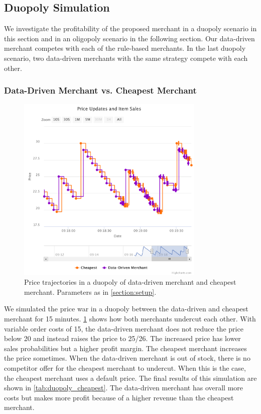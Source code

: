 \subsection{Duopoly Simulation}
\label{section:duopoly}
We investigate the profitability of the proposed merchant in a duopoly scenario in this section and in an oligopoly scenario in the following section.
Our data-driven merchant competes with each of the rule-based merchants.
In the last duopoly scenario, two data-driven merchants with the same strategy compete with each other.

\subsubsection{Data-Driven Merchant vs. Cheapest Merchant}

\begin{figure}[t]
	\centering
	\includegraphics[width=0.8\textwidth]{figures/duopoly_cheapest_prices}
	\caption[Price Trajectories: Data-Driven Merchant versus Cheapest Merchant]{Price trajectories in a duopoly of data-driven merchant and cheapest merchant. Parameters as in \cref{section:setup}.}
	\label{fig:duopoly_cheapest}
\end{figure}

We simulated the price war in a duopoly between the data-driven and cheapest merchant for 15 minutes.
\cref{fig:duopoly_cheapest} shows how both merchants undercut each other.
With variable order costs of 15, the data-driven merchant does not reduce the price below 20 and instead raises the price to 25/26.
The increased price has lower sales probabilities but a higher profit margin.
The cheapest merchant increases the price sometimes.
When the data-driven merchant is out of stock, there is no competitor offer for the cheapest merchant to undercut.
When this is the case, the cheapest merchant uses a default price.
The final results of this simulation are shown in \cref{tab:duopoly_cheapest}.
The data-driven merchant has overall more costs but makes more profit because of a higher revenue than the cheapest merchant.

